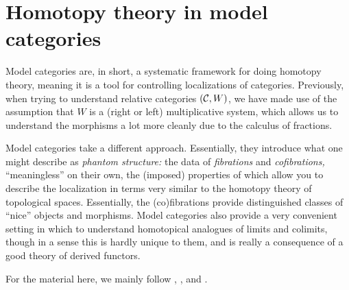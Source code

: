 
\newcommand{\Cof}{\operatorname{Cof}}
\newcommand{\Fib}{\operatorname{Fib}}
\newcommand{\tailto}{\rightarrowtail}
\renewcommand{\simh}{\overset{h}{\sim}}

\section{Homotopy theory in model categories}\label{lecture:model-categories}

Model categories are, in short, a systematic framework for doing homotopy theory, meaning it is a tool for controlling localizations of categories. Previously, when trying to understand
relative categories \((\mathcal{C},W)\), we have made use of the assumption that \(W\) is a (right or left) multiplicative system, which allows us to understand the morphisms a lot more
cleanly due to the calculus of fractions.

Model categories take a different approach. Essentially, they introduce what one might describe as \emph{phantom structure:} the data of \emph{fibrations} and \emph{cofibrations,}
``meaningless'' on their own, the (imposed) properties of which allow you to describe the localization in terms very similar to the homotopy theory of topological spaces.
Essentially, the (co)fibrations provide distinguished classes of ``nice'' objects and morphisms. Model categories also provide a very convenient setting in which to understand homotopical analogues
of limits and colimits, though in a sense this is hardly unique to them, and is really a consequence of a good theory of derived functors.

For the material here, we mainly follow \cite{riehl-categorical-homotopy-theory}, \cite{cisinski-book}, and \cite{may-ponto-more-concise-algebraic-topology}.

